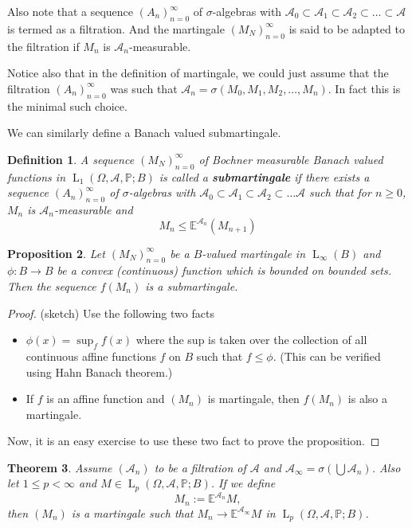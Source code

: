 \documentclass[]{report}
\newcommand{\lp}[2]{\operatorname{L}_{#1}({#2})}
\newcommand{\pspc}{\Omega,\mathcal{A},\mathbb{P}}
\newcommand*{\extop}[1]{\mathbb{E}^{{#1}}}
\newtheorem{theorem}{Theorem}[chapter]
\newtheorem{prop}[theorem]{Proposition}
\newtheorem{Def}[theorem]{Definition}
\begin{document}
Also note that a  sequence $(A_n)_{n=0}^{\infty}$ of $\sigma$-algebras with $\mathcal A_0 \subset \mathcal A_1 \subset \mathcal A_2 \subset \ldots \subset \mathcal{A}$ is termed as a filtration. And the martingale $(M_N)_{n=0}^{\infty}$ is said to be adapted to the filtration if $M_n$ is $\mathcal{A}_n$-measurable.

Notice also that in the definition of martingale, we could just assume that the filtration $(A_n)_{n=0}^{\infty}$ was such that $\mathcal{A}_n = \sigma(M_0,M_1,M_2,\ldots,M_n)$. In fact this is the minimal such choice.

We can similarly define a Banach valued submartingale.
\begin{Def}
	A sequence $(M_N)_{n=0}^{\infty}$ of Bochner measurable Banach valued functions in $\lp{1}{\pspc;B}$ is called a \textbf{submartingale} if there exists a sequence $(A_n)_{n=0}^{\infty}$ of $\sigma$-algebras with $\mathcal A_0 \subset \mathcal A_1 \subset \mathcal A_2 \subset \ldots \mathcal{A}$ such that for $n\geq 0$, $M_n$ is $\mathcal{A}_n$-measurable and \[ M_n \leq \mathbb{E}^{\mathcal A_n}(M_{n+1}) \] 
\end{Def}

\begin{prop}
	Let $(M_N)_{n=0}^{\infty}$ be a $B$-valued martingale in $\lp{\infty}{B}$ and $\phi: B \rightarrow B$ be a convex (continuous) function which is bounded on bounded sets. Then the sequence $f(M_n)$ is a submartingale.
\end{prop}
\begin{proof}{(sketch)}
	Use the following two facts 
	\begin{itemize}
		\item $\phi(x)=\sup_f f(x)$ where the sup is taken over the collection of all continuous affine functions $f$ on $B$ such that $f\leq \phi$. (This can be verified using Hahn Banach theorem.)
		\item If $f$ is an affine function and $(M_n)$ is martingale, then $f(M_n)$ is also a martingale.
	\end{itemize}
	Now, it is an easy exercise to use these two fact to prove the proposition.
\end{proof}

\begin{theorem} \label{lplimit}
	Assume $(\mathcal{A}_n)$ to be a filtration of $\mathcal{A}$ and $\mathcal{A}_{\infty}=\sigma\left(\bigcup\mathcal{A}_n\right)$. Also let $1\leq p < \infty$ and $M \in \lp{p}{\pspc;B}$. If we define \[M_n := \extop{\mathcal{A}_n}M, \] then $(M_n)$ is a martingale such that $M_n \rightarrow \extop{\mathcal{A}_{\infty}}M$ in $\lp{p}{\pspc ;B}$.
\end{theorem}
\end{document}
